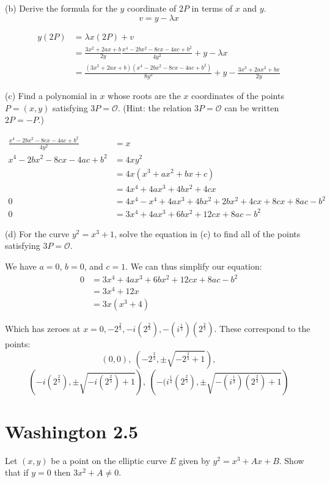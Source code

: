 \documentclass{article}
\begin{document}
(b) Derive the formula for the $y$ coordinate of $2P$ in terms of $x$ and $y$.
$$v = y - \lambda x$$

\begin{align*}
y(2P) &= \lambda x(2P) + v \\
&= \frac{3x^2 + 2ax + b}{2y}\frac{x^4 - 2bx^2 - 8cx - 4ac + b^2}{4y^2} + y - \lambda x \\
&= \frac{(3x^2 + 2ax + b)(x^4 - 2bx^2 - 8cx - 4ac + b^2)}{8y^3} + y - \frac{3x^3 + 2ax^2 + bx}{2y}
\end{align*}

(c) Find a polynomial in $x$ whose roots are the $x$ coordinates of the points $P=(x,y)$ satisfying $3P=\mathcal{O}$. (Hint: the relation $3P = \mathcal{O}$ can be written $2P = -P$.)

\begin{align*}
\frac{x^4 - 2bx^2 - 8cx - 4ac + b^2}{4y^2} &= x \\
x^4 - 2bx^2 - 8cx - 4ac + b^2 &= 4xy^2 \\
&= 4x(x^3 + ax^2 + bx + c) \\
&= 4x^4 + 4ax^3 + 4bx^2 + 4cx \\
0 &= 4x^4 - x^4 + 4ax^3 + 4bx^2 + 2bx^2 + 4cx + 8cx + 8ac - b^2 \\
0 &= 3x^4 + 4ax^3 + 6bx^2 + 12cx + 8ac - b^2
\end{align*}

(d) For the curve $y^2 = x^3 + 1$, solve the equation in (c) to find all of the points satisfying $3P = \mathcal{O}$.

We have $a = 0$, $b = 0$, and $c = 1$. We can thus simplify our equation:
\begin{align*}
0 &= 3x^4 + 4ax^3 + 6bx^2 + 12cx + 8ac - b^2 \\
&= 3x^4 + 12x \\
&= 3x(x^3 + 4)
\end{align*}

Which has zeroes at $x = 0,-2^\frac{2}{3},-i(2^\frac{2}{3}),-(i^\frac{1}{3})(2^\frac{2}{3})$. These correspond to the points:
$$(0, 0),~\left(-2^\frac{2}{3}, \pm \sqrt{-2^\frac{2}{3} + 1}\right),$$
$$\left(-i(2^\frac{2}{3}), \pm \sqrt{-i(2^\frac{2}{3}) + 1}\right),~\left(-(i^\frac{1}{3}(2^\frac{2}{3}), \pm \sqrt{-(i^\frac{1}{3})(2^\frac{2}{3}) + 1}\right)$$

\section{Washington 2.5}
Let $(x,y)$ be a point on the elliptic curve $E$ given by $y^2 = x^3 + Ax + B$. Show that if $y = 0$ then $3x^2 + A \neq 0$. 
\end{document}
